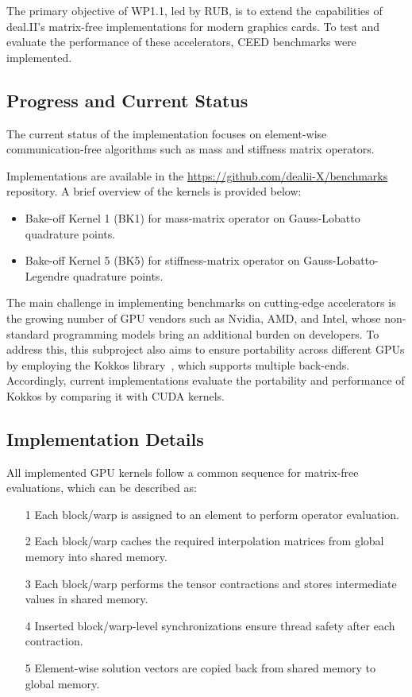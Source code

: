 \documentclass[a4paper,12pt]{article}
\begin{document}
The primary objective of WP1.1, led by RUB, is to extend the capabilities of deal.II’s matrix-free implementations for modern graphics cards. To test and evaluate the performance of these accelerators, CEED benchmarks \cite{Kolev2021} were implemented. 

\subsection{Progress and Current Status}

The current status of the implementation focuses on element-wise communication-free algorithms such as mass and stiffness matrix operators. 

Implementations are available in the \url{https://github.com/dealii-X/benchmarks} repository. A brief overview of the kernels is provided below:
\begin{itemize}
\item Bake-off Kernel 1 (BK1) for mass-matrix operator on Gauss-Lobatto quadrature points.
\item Bake-off Kernel 5 (BK5) for stiffness-matrix operator on Gauss-Lobatto-Legendre quadrature points.
\end{itemize}

The main challenge in implementing benchmarks on cutting-edge accelerators is the growing number of GPU vendors such as Nvidia, AMD, and Intel, whose non-standard programming models bring an additional burden on developers. To address this, this subproject also aims to ensure portability across different GPUs by employing the Kokkos library~\cite{Trott2022}, which supports multiple back-ends. Accordingly, current implementations evaluate the portability and performance of Kokkos by comparing it with CUDA kernels.


\subsection{Implementation Details}

All implemented GPU kernels follow a common sequence for matrix-free evaluations, which can be described as:
\begin{itemize}
\item[1] Each block/warp is assigned to an element to perform operator evaluation.
\item [2] Each block/warp caches the required interpolation matrices from global memory into shared memory.
\item[3] Each block/warp performs the tensor contractions and stores intermediate values in shared memory.
\item[4] Inserted block/warp-level synchronizations ensure thread safety after each contraction.
\item[5] Element-wise solution vectors are copied back from shared memory to global memory.
\end{itemize}
\end{document}
